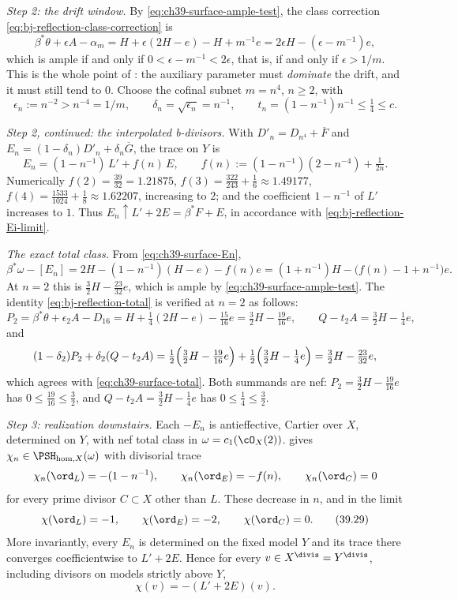 \begin{example}
\emph{Step 2: the drift window.}  By
\eqref{eq:ch39-surface-ample-test}, the class correction
\eqref{eq:bj-reflection-class-correction} is
\[
 \beta^*\theta+\epsilon A-\alpha_m
 =H+\epsilon(2H-e)-H+m^{-1}e
 =2\epsilon H-(\epsilon-m^{-1})e,
\]
which is ample if and only if $0<\epsilon-m^{-1}<2\epsilon$, that is, if
and only if $\epsilon>1/m$.  This is the whole point of
: the auxiliary parameter must \emph{dominate}
the drift, and it must still tend to $0$.  Choose the cofinal subnet
$m=n^4$, $n\ge2$, with
\[
 \epsilon_n:=n^{-2}>n^{-4}=1/m,
 \qquad
 \delta_n=\sqrt{\epsilon_n}=n^{-1},
 \qquad
 t_n=(1-n^{-1})n^{-1}\le\tfrac14\le c .
\tag{39.26}\label{eq:ch39-surface-window}
\]

\emph{Step 2, continued: the interpolated b-divisors.}  With
$D'_n=D_{n^4}+\overline F$ and
$E_n=(1-\delta_n)D'_n+\delta_n\overline G$, the trace on $Y$ is
\[
 E_n=(1-n^{-1})\,L'+f(n)\,E,
 \qquad
 f(n):=(1-n^{-1})(2-n^{-4})+\tfrac1{2n}.
\tag{39.27}\label{eq:ch39-surface-En}
\]
Numerically $f(2)=\frac{39}{32}=1.21875$,
$f(3)=\frac{322}{243}+\frac16\approx1.49177$,
$f(4)=\frac{1533}{1024}+\frac18\approx1.62207$, increasing to $2$; and
the coefficient $1-n^{-1}$ of $L'$ increases to $1$.  Thus
$E_n\uparrow L'+2E=\beta^*F+E$, in accordance with
\eqref{eq:bj-reflection-Ei-limit}.

\emph{The exact total class.}  From \eqref{eq:ch39-surface-En},
\[
 \beta^*\omega-[E_n]
 =2H-(1-n^{-1})(H-e)-f(n)e
 =(1+n^{-1})H-\bigl(f(n)-1+n^{-1}\bigr)e .
\tag{39.28}\label{eq:ch39-surface-total}
\]
At $n=2$ this is $\frac32H-\frac{23}{32}e$, which is ample by
\eqref{eq:ch39-surface-ample-test}.  The identity
\eqref{eq:bj-reflection-total} is verified at $n=2$ as follows:
\[
 P_2=\beta^*\theta+\epsilon_2A-D_{16}
 =H+\tfrac14(2H-e)-\tfrac{15}{16}e=\tfrac32H-\tfrac{19}{16}e,
 \qquad
 Q-t_2A=\tfrac32H-\tfrac14e,
\]
and
\[
 (1-\delta_2)P_2+\delta_2(Q-t_2A)
 =\tfrac12\Bigl(\tfrac32H-\tfrac{19}{16}e\Bigr)
 +\tfrac12\Bigl(\tfrac32H-\tfrac14e\Bigr)
 =\tfrac32H-\tfrac{23}{32}e,
\]
which agrees with \eqref{eq:ch39-surface-total}.  Both summands are nef:
$P_2=\frac32H-\frac{19}{16}e$ has $0\le\frac{19}{16}\le\frac32$, and
$Q-t_2A=\frac32H-\frac14e$ has $0\le\frac14\le\frac32$.

\emph{Step 3: realization downstairs.}  Each $-E_n$ is antieffective,
Cartier over $X$, determined on $Y$, with nef total class in
$\omega=c_1(\cO_X(2))$.   gives
$\chi_n\in\PSH_{\mathrm{hom},X}(\omega)$ with divisorial trace
\[
 \chi_n(\ord_L)=-(1-n^{-1}),\qquad
 \chi_n(\ord_E)=-f(n),\qquad
 \chi_n(\ord_C)=0
\]
for every prime divisor $C\subset X$ other than $L$.  These decrease in
$n$, and in the limit
\[
 \chi(\ord_L)=-1,\qquad \chi(\ord_E)=-2,\qquad \chi(\ord_C)=0 .
\tag{39.29}\label{eq:ch39-surface-chi-trace}
\]
More invariantly, every $E_n$ is determined on the fixed model $Y$ and
its trace there converges coefficientwise to $L'+2E$.  Hence for every
$v\in X^{\divis}=Y^{\divis}$, including divisors on models strictly above
$Y$,
\[
                         \chi(v)=-(L'+2E)(v).
\]


\end{example}
